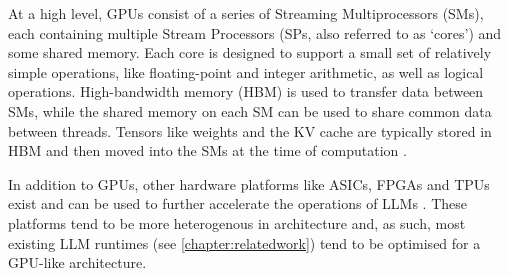 \documentclass[12pt,twoside]{report}
\begin{document}
At a high level, GPUs consist of a series of Streaming Multiprocessors (SMs), each containing multiple Stream Processors (SPs, also referred to as `cores') and some shared memory\cite{choquette2021nvidia}. 
Each core is designed to support a small set of relatively simple operations, like floating-point and integer arithmetic, as well as logical operations.
High-bandwidth memory (HBM) is used to transfer data between SMs, while the shared memory on each SM can be used to share common data between threads.
Tensors like weights and the KV cache are typically stored in HBM and then moved into the SMs at the time of computation \cite{pope2023efficiently}.

In addition to GPUs, other hardware platforms like ASICs, FPGAs and TPUs exist and can be used to further accelerate the operations of LLMs \cite{li2024large}.
These platforms tend to be more heterogenous in architecture and, as such, most existing LLM runtimes (see \ref{chapter:relatedwork}) tend to be optimised for a GPU-like architecture.
\end{document}
